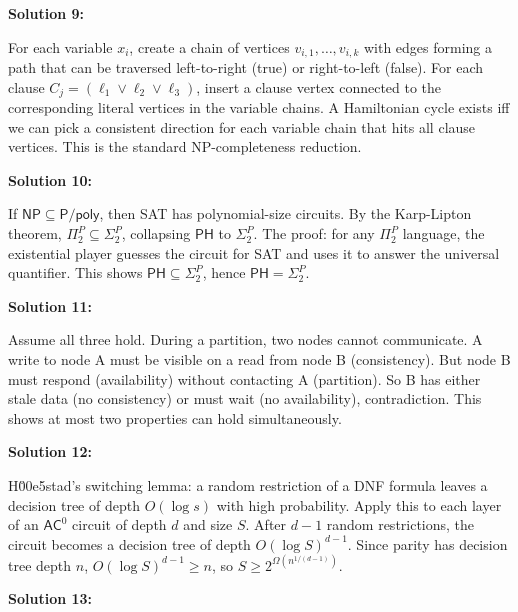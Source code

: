 \documentclass[12pt,a4paper]{exam}
\begin{document}
\vspace{0.5cm}

\textbf{Solution 9:}

For each variable $x_i$, create a chain of vertices $v_{i,1}, \ldots, v_{i,k}$ with edges forming a path that can be traversed left-to-right (true) or right-to-left (false). For each clause $C_j = (\ell_1 \lor \ell_2 \lor \ell_3)$, insert a clause vertex connected to the corresponding literal vertices in the variable chains. A Hamiltonian cycle exists iff we can pick a consistent direction for each variable chain that hits all clause vertices. This is the standard NP-completeness reduction.

\vspace{0.5cm}

\textbf{Solution 10:}

If $\mathsf{NP} \subseteq \mathsf{P}/\mathsf{poly}$, then SAT has polynomial-size circuits. By the Karp-Lipton theorem, $\Pi_2^P \subseteq \Sigma_2^P$, collapsing $\mathsf{PH}$ to $\Sigma_2^P$. The proof: for any $\Pi_2^P$ language, the existential player guesses the circuit for SAT and uses it to answer the universal quantifier. This shows $\mathsf{PH} \subseteq \Sigma_2^P$, hence $\mathsf{PH} = \Sigma_2^P$.

\vspace{0.5cm}

\textbf{Solution 11:}

Assume all three hold. During a partition, two nodes cannot communicate. A write to node A must be visible on a read from node B (consistency). But node B must respond (availability) without contacting A (partition). So B has either stale data (no consistency) or must wait (no availability), contradiction. This shows at most two properties can hold simultaneously.

\vspace{0.5cm}

\textbf{Solution 12:}

H\u00e5stad's switching lemma: a random restriction of a DNF formula leaves a decision tree of depth $O(\log s)$ with high probability. Apply this to each layer of an $\mathsf{AC}^0$ circuit of depth $d$ and size $S$. After $d-1$ random restrictions, the circuit becomes a decision tree of depth $O(\log S)^{d-1}$. Since parity has decision tree depth $n$, $O(\log S)^{d-1} \geq n$, so $S \geq 2^{\Omega(n^{1/(d-1)})}$.

\vspace{0.5cm}

\textbf{Solution 13:}
\end{document}
